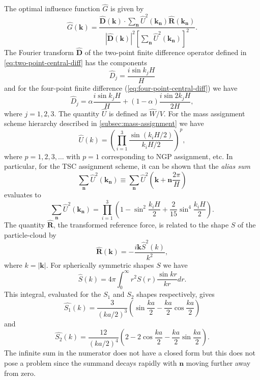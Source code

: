 The optimal influence function $\hat{G}$ is given by
\begin{equation*}
    \hat{G}(\mathbf{k}) = \frac{\hat{\mathbf{D}}(\mathbf{k}) \cdot \sum_{\mathbf{n}}\hat{U}^2(\mathbf{k_\mathbf{n}}) \hat{\mathbf{R}}(\mathbf{k}_\mathbf{n})}{|\hat{\mathbf{D}}(\mathbf{k})|^2 \left[ \sum_{\mathbf{n}}\hat{U}^2(\mathbf{k}_\mathbf{n}) \right]^2}.
\end{equation*}
The Fourier transform $\hat{\mathbf{D}}$ of the two-point finite difference operator defined in \autoref{eq:two-point-central-diff} has the components
\begin{equation*}
    \hat{D}_j = \frac{i\sin k_j H}{H}
\end{equation*}
and for the four-point finite difference (\autoref{eq:four-point-central-diff}) we have
\begin{equation*}
    \hat{D}_j = \alpha\frac{i\sin k_j H}{H} + (1- \alpha)\frac{i\sin 2k_j H}{2H},
\end{equation*}
where $j=1,2,3$.
The quantity $\hat{U}$ is defined as $\hat{W}/V$.
For the mass assignment scheme hierarchy described in \autoref{subsec:mass-assignment} we have
\begin{equation*}
    \hat{U}(k) = \left(\prod_{i=1}^{3}\frac{\sin(k_i H / 2)}{k_i H / 2}\right)^{p},
\end{equation*}
where $p=1,2,3,\dots$ with $p=1$ corresponding to NGP assignment, etc.
In particular, for the TSC assignment scheme, it can be shown that the \textit{alias sum}
\begin{equation*}
    \sum_{\mathbf{n}}\hat{U}^2(\mathbf{k}_\mathbf{n})
    \equiv \sum_{\mathbf{n}}\hat{U}^2\left(\mathbf{k} + \mathbf{n}\frac{2\pi}{H}\right)
\end{equation*}
evaluates to
\begin{equation*}
    \sum_{\mathbf{n}}\hat{U}^2(\mathbf{k}_\mathbf{n})
    = \prod_{i=1}^{3} \left(1 - \sin^2\frac{k_i H}{2} + \frac{2}{15}\sin^4\frac{k_i H}{2}\right).
\end{equation*}
The quantity $\hat{\mathbf{R}}$, the transformed reference force, is related to the shape $S$ of the particle-cloud by
\begin{equation*}
    \hat{\mathbf{R}}(\mathbf{k}) = -\frac{i\mathbf{k}\hat{S}^2(k)}{k^2},
\end{equation*}
where $k = |\mathbf{k}|$.
For spherically symmetric shapes $S$ we have
\begin{equation*}
    \hat{S}(k) = 4\pi \int_{0}^{\infty} r^2 S(r)\frac{\sin kr}{kr}dr.
\end{equation*}
This integral, evaluated for the $S_1$ and $S_2$ shapes respectively, gives
\begin{equation*}
    \hat{S_1}(k) = \frac{3}{(ka/2)^3}  \left(\sin\frac{ka}{2} - \frac{ka}{2} \cos\frac{ka}{2}\right)
\end{equation*}
and
\begin{equation*}
    \hat{S_2}(k) = \frac{12}{(ka/2)^4}\left(2 - 2\cos\frac{ka}{2}-\frac{ka}{2}\sin\frac{ka}{2}\right).
\end{equation*}
The infinite sum in the numerator does not have a closed form but this does not pose a problem since the summand decays rapidly with $\mathbf{n}$ moving further away from zero.

